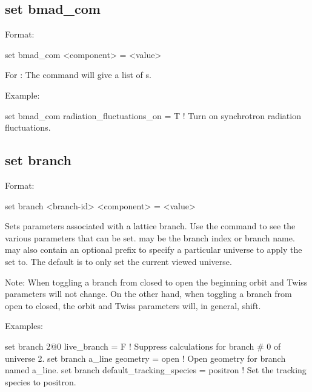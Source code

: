 {{%

\subsection{set bmad_com}
\label{s:set.bmad.com}

Format:
\begin{example}
  set bmad_com <component> = <value>
\end{example}

For : The  command will give a list of 
s.

Example:
\begin{example}
  set bmad_com radiation_fluctuations_on = T ! Turn on synchrotron radiation fluctuations.
\end{example}


\subsection{set branch}
\label{s:set.branch}

Format:
\begin{example}
  set branch <branch-id> <component> = <value>
\end{example}

Sets parameters associated with a lattice branch. Use the  command to see the
various parameters that can be set.  may be the branch index or branch
name.  may also contain an optional  prefix to specify a particular universe
to apply the set to. The default is to only set the current viewed universe.

Note: When toggling a branch from closed to open the beginning orbit and Twiss parameters will not
change. On the other hand, when toggling a branch from open to closed, the orbit and Twiss
parameters will, in general, shift.

Examples:
\begin{example}
  set branch 2@0 live_branch = F     ! Suppress calculations for branch \# 0 of universe 2.
  set branch a_line geometry = open  ! Open geometry for branch named a_line.
  set branch default_tracking_species = positron
                                     ! Set the tracking species to positron.
\end{example}

}}
